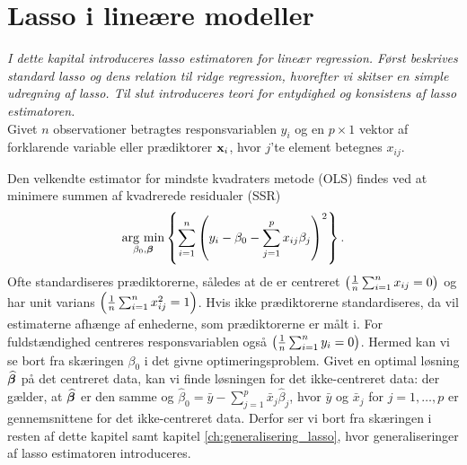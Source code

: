 \chapter{Lasso i lineære modeller}
\textit{I dette kapital introduceres lasso estimatoren for lineær regression. 
Først beskrives standard lasso og dens relation til ridge regression, hvorefter vi skitser en simple udregning af lasso.
Til slut introduceres teori for entydighed og konsistens af lasso estimatoren.} \\[4mm]
%
Givet \(n\) observationer betragtes responsvariablen \(y_i\) og en \(p \times 1\) vektor af forklarende variable eller prædiktorer \(\mathbf{x}_i\), hvor \(j\)'te element betegnes \(x_{ij}\).

Den velkendte estimator for mindste kvadraters metode (OLS) findes ved at minimere summen af kvadrerede residualer (SSR)
\begin{align}
\argmin_{\beta_0, \tbeta} \cbr{\sum_{i=1}^n \del{y_i - \beta_0 - \sum_{j=1}^p x_{ij} \beta_j}^2}. \label{eq:OLS}
\end{align}
%
Ofte standardiseres prædiktorerne, således at de er centreret \( \del{\frac{1}{n} \sum_{i=1}^n x_{ij} = 0}\) og har unit varians \( \del{\frac{1}{n} \sum_{i=1}^n x_{ij}^2=1}\).
Hvis ikke prædiktorerne standardiseres, da vil estimaterne afhænge af enhederne, som prædiktorerne er målt i.
For fuldstændighed centreres responsvariablen også \( \del{\frac{1}{n} \sum_{i=1}^n y_{i} = 0} \).
Hermed kan vi se bort fra skæringen $\beta_0$ i det givne optimeringsproblem.
Givet en optimal løsning \(\widehat{\boldsymbol{\beta}}\) på det centreret data, kan vi finde løsningen for det ikke-centreret data: der gælder, at \(\widehat{\boldsymbol{\beta}}\) er den samme og 
\(\widehat{\beta}_0 = \bar{y} - \sum_{j=1}^p \bar{x}_j \widehat{\beta}_j\), hvor \(\bar{y}\) og \(\bar{x}_j \) for \(j=1, \ldots, p\) er gennemsnittene for det ikke-centreret data.
Derfor ser vi bort fra skæringen i resten af dette kapitel samt kapitel \ref{ch:generalisering_lasso}, hvor generaliseringer af lasso estimatoren introduceres.

